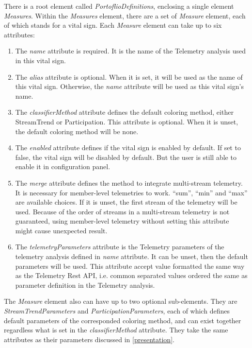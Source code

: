 There is a root element called {\it PortoflioDefinitions}, enclosing a single element {\it Measures}. Within the {\it Measures} element, there are a set of {\it Measure} element, each of which stands for a vital sign. Each {\it Measure} element can take up to six attributes:
\begin{enumerate}
\item The {\it name} attribute is required. It is the name of the Telemetry analysis used in this vital sign.
\item The {\it alias} attribute is optional. When it is set, it will be used as the name of this vital sign. Otherwise, the {\it name} attribute will be used as this vital sign's name.
\item The {\it classifierMethod} attribute defines the default coloring method, either StreamTrend or Participation. This attribute is optional. When it is unset, the default coloring method will be none.
\item The {\it enabled} attribute defines if the vital sign is enabled by default. If set to false, the vital sign will be disabled by default. But the user is still able to enable it in configuration panel.
\item The {\it merge} attribute defines the method to integrate multi-stream telemetry. It is necessary for member-level telemetries to work. ``sum'', ``min'' and ``max'' are available choices. If it is unset, the first stream of the telemetry will be used. Because of the order of streams in a multi-stream telemetry is not guaranteed, using member-level telemetry without setting this attribute might cause unexpected result.
\item The {\it telemetryParameters} attribute is the Telemetry parameters of the telemetry analysis defined in {\it name} attribute. It can be unset, then the default parameters will be used. This attribute accept value formatted the same way as the Telemetry Rest API, i.e. common separated values ordered the same as parameter definition in the Telemetry analysis.
\end{enumerate}

The {\it Measure} element also can have up to two optional sub-elements. They are {\it StreamTrendParameters} and {\it ParticipationParameters}, each of which defines default parameters of the corresponded coloring method, and can exist together regardless what is set in the {\it classifierMethod} attribute. They take the same attributes as their parameters discussed in \autoref{presentation}.

